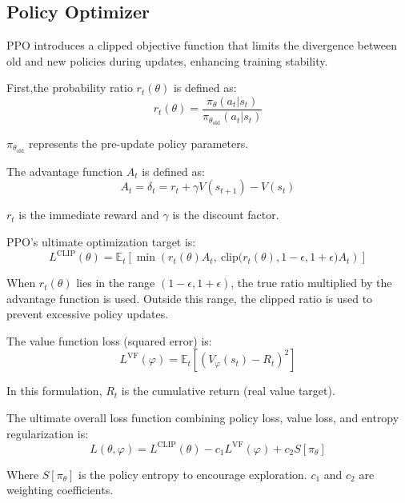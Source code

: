 \subsection{Policy Optimizer}

PPO introduces a clipped objective function that limits the divergence between old and new policies during updates, enhancing training stability.

First,the probability ratio $r_t(\theta)$ is defined as:
\begin{equation}
	r_t(\theta) = \frac{\pi_{\theta}(a_t | s_t)}{\pi_{\theta_{\text{old}}}(a_t | s_t)} \tag{4.11}
\end{equation}

$\pi_{\theta_{\text{old}}}$ represents the pre-update policy parameters.

The advantage function $A_t$ is defined as:
\begin{equation}
	A_t = \delta_t = r_t + \gamma V(s_{t+1}) - V(s_t) \tag{4.12}
\end{equation}

$r_t$ is the immediate reward and $\gamma$ is the discount factor.

PPO's ultimate optimization target is:
\begin{equation}
	L^{\text{CLIP}}(\theta) = \mathbb{E}_t \left[ \min \left( r_t(\theta) A_t, \ \text{clip}\big(r_t(\theta), 1-\epsilon, 1+\epsilon\big) A_t \right) \right] \tag{4.13}
\end{equation}

When \(r_t(\theta)\) lies in the range \((1-\epsilon, 1+\epsilon)\), the true ratio multiplied by the advantage function is used. Outside this range, the clipped ratio is used to prevent excessive policy updates.

The value function loss (squared error) is:
\begin{equation}
	L^{\text{VF}}(\varphi) = \mathbb{E}_t \left[ \left(V_{\varphi}(s_t) - R_t\right)^2 \right] \tag{4.14}
\end{equation}

In this formulation, $R_t$ is the cumulative return (real value target).

The ultimate overall loss function combining policy loss, value loss, and entropy regularization is:
\begin{equation}
	L(\theta, \varphi) = L^{\text{CLIP}}(\theta) - c_1 L^{\text{VF}}(\varphi) + c_2 S[\pi_{\theta}] \tag{4.15}
\end{equation}

Where \(S[\pi_{\theta}]\) is the policy entropy to encourage exploration. \(c_1\) and \(c_2\) are weighting coefficients.

